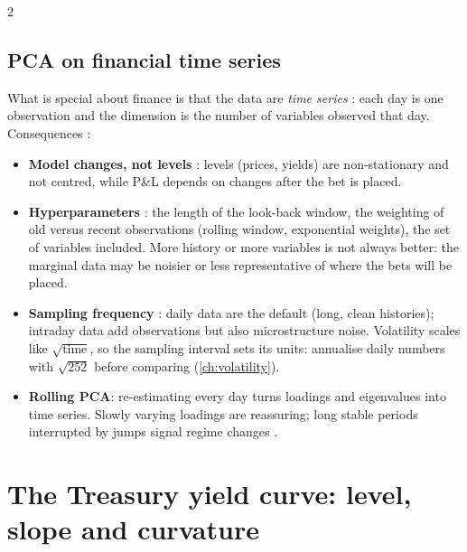 \begin{paracol}{2}
\subsection{PCA on financial time series}\label{ch07:sec-ts}
What is special about finance is that the data are \emph{time series} : each day is one
observation and the dimension is the number of variables observed that day. Consequences :
\begin{itemize}
  \item \textbf{Model changes, not levels} : levels (prices, yields) are non-stationary and not
        centred, while P\&L depends on changes after the bet is placed.
  \item \textbf{Hyperparameters} : the length of the look-back window, the weighting of old
        versus recent observations (rolling window, exponential weights), the set of variables included.
        More history or more variables is not always better: the marginal data may be noisier or less
        representative of where the bets will be placed.
  \item \textbf{Sampling frequency} : daily data are the default (long, clean histories);
        intraday data add observations but also microstructure noise. Volatility scales like
        $\sqrt{\text{time}}$, so the sampling interval sets its units: annualise daily numbers with $\sqrt{252}$
        before comparing  (\cref{ch:volatility}).
  \item \textbf{Rolling PCA}: re-estimating every day turns loadings and eigenvalues into time series.
        Slowly varying loadings are reassuring; long stable periods interrupted by jumps signal regime
        changes .
\end{itemize}

\section{The Treasury yield curve: level, slope and curvature}\label{ch07:sec-yield}


\end{paracol}
